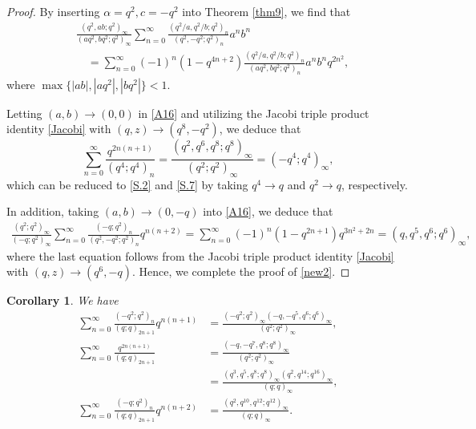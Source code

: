 \documentclass[reqno,12pt]{amsart}
\newtheorem{corollary}[theorem]{Corollary}
\theoremstyle{remark}
\numberwithin{equation}{section}
\begin{document}
\begin{proof}
By inserting $\alpha=q^2,c=-q^2$ into Theorem \ref{thm9}, we find that 
\begin{align}
&\frac{\left(q^2,ab;q^2\right)_{\infty}}
{\left(aq^2,bq^2;q^2\right)_{\infty}}\sum_{n=0}^{\infty}
\frac{\left(q^2/a,q^2/b;q^2\right)_{n}}
{\left(q^2,-q^2;q^2\right)_{n}}a^nb^n\nonumber\\
&\quad=\sum_{n=0}^{\infty}\left(-1\right)^n\left(1-q^{4n+2}\right)
\frac{\left(q^2/a,q^2/b;q^2\right)_{n}}
{\left(aq^2,bq^2;q^2\right)_n}
a^nb^nq^{2n^2},\label{A16}
\end{align}
where $\max\{|ab|,|aq^2|,|bq^2|\}<1$.

Letting $\left(a,b\right)\to\left(0,0\right)$ in \eqref{A16} and utilizing the Jacobi triple product identity \eqref{Jacobi} with $\left(q,z\right)\to\left(q^8,-q^2\right)$, we deduce that
\begin{equation*}
\sum_{n=0}^{\infty}\frac{q^{2n\left(n+1\right)}}{\left(q^4;q^4\right)_n}
=\frac{\left(q^2,q^6,q^8;q^8\right)_{\infty}}{\left(q^2;q^2\right)_{\infty}}=\left(-q^4;q^4\right)_{\infty},
\end{equation*}
which can be reduced to \eqref{S.2} and  \eqref{S.7} by taking $q^4\to q$ and $q^2\to q$, respectively.

In addition, taking $\left(a,b\right)\to\left(0,-q\right)$ into  \eqref{A16}, we deduce that
\begin{align*}
\frac{\left(q^2;q^2\right)_{\infty}}{\left(-q;q^2\right)_{\infty}}
\sum_{n=0}^{\infty}
\frac{\left(-q;q^2\right)_{n}}
{\left(q^2,-q^2;q^2\right)_{n}}q^{n\left(n+2\right)}
=\sum_{n=0}^{\infty}\left(-1\right)^n
\left(1-q^{2n+1}\right)q^{3n^2+2n}
=\left(q,q^5,q^6;q^6\right)_{\infty},
\end{align*}
where the last equation follows from  the Jacobi triple product identity \eqref{Jacobi} with $\left(q,z\right)\to\left(q^6,-q\right)$. Hence, we complete the proof of \ref{new2}.
\end{proof}
\begin{corollary}
We have
\begin{align}
\sum_{n=0}^{\infty}\frac{\left(-q^2;q^2\right)_n}
{\left(q;q\right)_{2n+1}}q^{n\left(n+1\right)}
&=\frac{\left(-q^2;q^2\right)_{\infty}\left(-q,-q^5,q^6;q^6\right)_{\infty}}
{\left(q^2;q^2\right)_{\infty}},\tag{S.28}\label{S.28}\\
\sum_{n=0}^{\infty}\frac{q^{2n\left(n+1\right)}}
{\left(q;q\right)_{2n+1}}
&=\frac{\left(-q,-q^7,q^8;q^8\right)_{\infty}}
{\left(q^2;q^2\right)_{\infty}}\tag{S.38} \label{S.38}\\
&=\frac{\left(q^3,q^5,q^8;q^8\right)_{\infty}
\left(q^2,q^{14};q^{16}\right)_{\infty}}{\left(q;q\right)_{\infty}}, \tag{S.86}\label{S.86}\\
\sum_{n=0}^{\infty}\frac{\left(-q;q^2\right)_n
}{\left(q;q\right)_{2n+1}}q^{n\left(n+2\right)}
&=
\frac{\left(q^2,q^{10},q^{12};q^{12}\right)_{\infty}}
{\left(q;q\right)_{\infty}}.\tag{S.50}\label{S.50}
\end{align}
\end{corollary}
\end{document}
